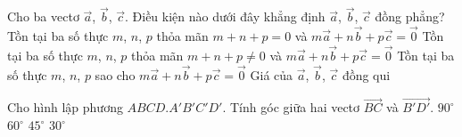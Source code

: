 \begin{ex}%
	Cho ba vectơ $\overrightarrow{a}$, $\overrightarrow{b}$, $\overrightarrow{c}$. Điều kiện nào dưới đây khẳng định $\overrightarrow{a}$, $\overrightarrow{b}$,  $\overrightarrow{c}$ đồng phẳng?
	\choice 
		{Tồn tại ba số thực  $m$, $n$, $p$ thỏa mãn $m+n+p=0$ và $m\overrightarrow{a}+n\overrightarrow{b}+p\overrightarrow{c}=\overrightarrow{0}$}
		{\True Tồn tại ba số thực $m$, $n$, $p$ thỏa mãn $m+n+p\ne 0$ và $m\overrightarrow{a}+n\overrightarrow{b}+p\overrightarrow{c}=\overrightarrow{0}$} 
		{Tồn tại ba số thực $m$, $n$,  $p$ sao cho $m\overrightarrow{a}+n\overrightarrow{b}+p\overrightarrow{c}=\overrightarrow{0}$}
		{Giá của $\overrightarrow{a}$, $\overrightarrow{b}$, $\overrightarrow{c}$  đồng qui}
\end{ex}

\begin{ex}%
	Cho hình lập phương $ABCD.A'B'C'D'$.  Tính góc giữa hai vectơ $\overrightarrow{BC}$ và $\overrightarrow{B'D'}$.
	\choice 
		{$90^\circ$} 
		 {$60^\circ$}
		 {\True $45^\circ$}
		 {$30^\circ$}
\end{ex}

